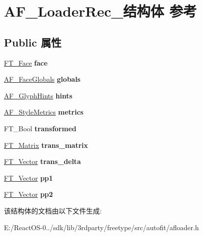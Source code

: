 \hypertarget{struct_a_f___loader_rec__}{}\section{A\+F\+\_\+\+Loader\+Rec\+\_\+结构体 参考}
\label{struct_a_f___loader_rec__}
\subsection*{Public 属性}
\begin{DoxyCompactItemize}
\item 
\mbox{\label{struct_a_f___loader_rec___ab5ea3d19d0f92ed0c4340bad6ea9571e}} 
\hyperlink{struct_f_t___face_rec__}{F\+T\+\_\+\+Face} {\bfseries face}
\item 
\mbox{\label{struct_a_f___loader_rec___aaa5bfe9e3eef5e053558791c326abf8b}} 
\hyperlink{struct_a_f___face_globals_rec__}{A\+F\+\_\+\+Face\+Globals} {\bfseries globals}
\item 
\mbox{\label{struct_a_f___loader_rec___a3022af76170c58486149424fe11f23ab}} 
\hyperlink{struct_a_f___glyph_hints_rec__}{A\+F\+\_\+\+Glyph\+Hints} {\bfseries hints}
\item 
\mbox{\label{struct_a_f___loader_rec___ac7c0ebbc7c2c102c0840bb12956044e7}} 
\hyperlink{struct_a_f___style_metrics_rec__}{A\+F\+\_\+\+Style\+Metrics} {\bfseries metrics}
\item 
\mbox{\label{struct_a_f___loader_rec___ac54a07cb9f710a0f469ad80e89f9560f}} 
F\+T\+\_\+\+Bool {\bfseries transformed}
\item 
\mbox{\label{struct_a_f___loader_rec___a5c30f601f3e6b669d52698a4d1bc9371}} 
\hyperlink{struct_f_t___matrix__}{F\+T\+\_\+\+Matrix} {\bfseries trans\+\_\+matrix}
\item 
\mbox{\label{struct_a_f___loader_rec___a5e8868a76379551f81c9e28d9bde9e16}} 
\hyperlink{struct_f_t___vector__}{F\+T\+\_\+\+Vector} {\bfseries trans\+\_\+delta}
\item 
\mbox{\label{struct_a_f___loader_rec___af75ddd1394d03f8a7a7ab50213611ab5}} 
\hyperlink{struct_f_t___vector__}{F\+T\+\_\+\+Vector} {\bfseries pp1}
\item 
\mbox{\label{struct_a_f___loader_rec___a38c518eb3646f0880b1ccc8e9be357fb}} 
\hyperlink{struct_f_t___vector__}{F\+T\+\_\+\+Vector} {\bfseries pp2}
\end{DoxyCompactItemize}


该结构体的文档由以下文件生成\+:\begin{DoxyCompactItemize}
\item 
E\+:/\+React\+O\+S-\/0../sdk/lib/3rdparty/freetype/src/autofit/afloader.\+h\end{DoxyCompactItemize}
